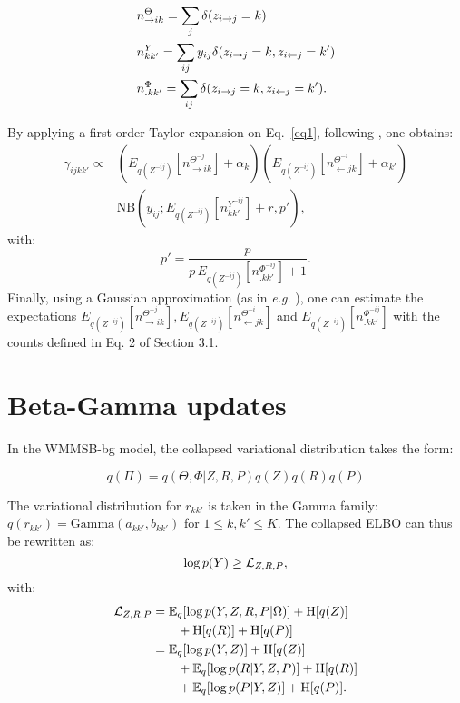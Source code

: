 \begin{align*}                                                                                                                                        
&n^{\Theta}_{\rightarrow ik} = \sum_j \delta(z_{i\rightarrow j}=k)\\
&n^{Y}_{kk'} = \sum_{ij} y_{ij}\delta(z_{i\rightarrow j}=k, z_{i\leftarrow j}=k') \\
&n^{\Phi}_{\bm{.}kk'} = \sum_{ij} \delta( z_{i\rightarrow j}=k, z_{i\leftarrow j}=k').
\end{align*}   

By applying a first order Taylor expansion on Eq.~\eqref{eq1}, following \cite{teh2007collapsed}, one obtains:
%
\begin{align*}
\gamma_{ijkk'} \propto & (E_{q(Z^{-ij})}[n_{\rightarrow ik}^{\Theta^{-j}}] + \alpha_k) (E_{q(Z^{-ij})}[n_{\leftarrow jk}^{\Theta^{-i}}] + \alpha_{k'}) \\
& \mathrm{NB}\left(y_{ij}; E_{q(Z^{-ij})}[n^{Y^{-ij}}_{kk'}] + r,  p' \right),
\end{align*}
%
with:
%
\[
p' = \frac{p}{p\,E_{q(Z^{-ij})}[n^{\Phi^{-ij}}_{\bm{.}kk'}] + 1}.
\]
%
Finally, using a Gaussian approximation (as in \textit{e.g.} \cite{asuncion2009smoothing}), one can estimate the expectations $E_{q(Z^{-ij})}[n_{\rightarrow ik}^{\Theta^{-j}}], E_{q(Z^{-ij})}[n_{\leftarrow jk}^{\Theta^{-i}}]$ and  $E_{q(Z^{-ij})}[n^{\Phi^{-ij}}_{\bm{.}kk'}]$ with the counts defined in Eq. 2 of Section 3.1.

\section*{Beta-Gamma updates}

In the WMMSB-bg model, the collapsed variational distribution takes the form:

\begin{equation*}
q(\Pi) = q(\Theta, \Phi|Z, R, P) q(Z)q(R)q(P)
\end{equation*}

The variational distribution for $r_{kk'}$ is taken in the Gamma family:  $q(r_{kk'}) = \textrm{Gamma}(a_{kk'},b_{kk'})$ for $1\leq k,k' \leq K$. The collapsed ELBO can thus be rewritten as:
%
\[
\log p(Y) \geq \mathcal{L}_{Z,R,P},
\]
%
with:
\begin{align*}
\mathcal{L}_{Z,R,P} &= \mathbb{E}_{q}[\log p(Y, Z, R, P|\Omega)] + \textrm{H}[q(Z)] \\
& \qquad + \textrm{H}[q(R)] + \textrm{H}[q(P)] \\
& = \mathbb{E}_{q}[\log p(Y, Z)] + \textrm{H}[q(Z)] \\
& \qquad + \mathbb{E}_{q}[\log p(R|Y,Z,P)] + \textrm{H}[q(R)] \\
& \qquad +\mathbb{E}_{q}[\log p(P|Y,Z)] + \textrm{H}[q(P)].
\end{align*}

